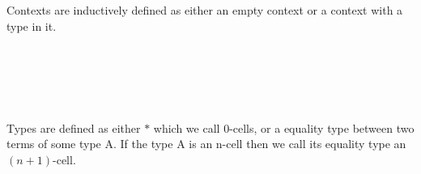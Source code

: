 \documentclass{acm_proc_article-sp}
\begin{document}
\begin{code}\>\<%
\\
\>  \<[19]%
\>[19]\AgdaSymbol{:} \<%
\\
\>  \AgdaSymbol{(} \AgdaSymbol{:} \AgdaSymbol{)} \<[19]%
\>[19]\AgdaSymbol{:} \<%
\\
\>  \<[19]%
\>[19]\AgdaSymbol{:} \AgdaSymbol{\{} \AgdaSymbol{:} \AgdaSymbol{\}(} \AgdaSymbol{:}  \AgdaSymbol{)}  \<%
\\
\>  \<[19]%
\>[19]\AgdaSymbol{:} \AgdaSymbol{\{} \AgdaSymbol{:} \AgdaSymbol{\}(} \AgdaSymbol{:}  \AgdaSymbol{)}  \<%
\\
\>  \<[19]%
\>[19]\AgdaSymbol{:}     \<%
\\
\>  \<[19]%
\>[19]\AgdaSymbol{:}   \<%
\\
\>\<\end{code}
Contexts are inductively defined as either an empty context or
a context with a type in it.

\begin{code}\>\<%
\\
\>  \<%
\\
\>[0]\<[2]%
\>[2] \<[8]%
\>[8]\AgdaSymbol{:} \<%
\\
\>[0]\<[2]%
\>[2]\AgdaInductiveConstructor{\_,\_} \<[8]%
\>[8]\AgdaSymbol{:} \AgdaSymbol{(} \AgdaSymbol{:} \AgdaSymbol{)(} \AgdaSymbol{:}  \AgdaSymbol{)}  \<%
\\
\>\<\end{code}
Types are defined as either $*$ which we
call 0-cells, or a equality type between two terms of some type A. If the
type A is an n-cell then we call its equality type an $(n+1)$-cell.
\end{document}
